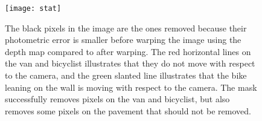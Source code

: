 \begin{figure}[H]
	\centering
	\texttt{[image: stat]}
	\caption{The black pixels in the image are the ones removed because their photometric error is smaller before warping the image using the depth map compared to after warping. The red horizontal lines on the van and bicyclist illustrates that they do not move with respect to the camera, and the green slanted line illustrates that the bike leaning on the wall is moving with respect to the camera. The mask successfully removes pixels on the van and bicyclist, but also removes some pixels on the pavement that should not be removed.}
	\label{fig:stat}
\end{figure}